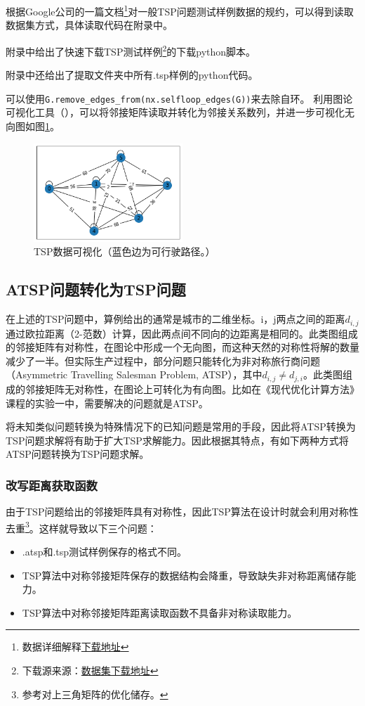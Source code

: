 \documentclass[lang=cn,11pt]{elegantpaper}
\begin{document}
根据Google公司的一篇文档\footnote{数据详细解释\href{https://docs.google.com/file/d/0B4zUGKjaO9uERU1RZDNuRkg3TW8/edit?resourcekey=0-MRgfJcUZrleab5nfdCOaoQ}{下载地址}}对一般TSP问题测试样例数据的规约，可以得到读取数据集方式，具体读取代码在附录中。

附录中给出了快速下载TSP测试样例\footnote{下载源来源：\href{http://elib.zib.de/pub/mp-testdata/tsp/tsplib/tsp/index.html}{数据集下载地址}}的下载python脚本。

附录中还给出了提取文件夹中所有.tsp样例的python代码。

可以使用\lstinline{G.remove_edges_from(nx.selfloop_edges(G))}来去除自环。
利用图论可视化工具（\cite{NetworkXweb}），可以将邻接矩阵读取并转化为邻接关系数列，并进一步可视化无向图如图\ref{img:TSP数据可视化}。
\begin{figure}[h]
  \centering
  \includegraphics[width=0.5\textwidth]{figure/TSP数据可视化.png} %
  \caption{TSP数据可视化（蓝色边为可行驶路径。）} %
  \label{img:TSP数据可视化} %
\end{figure}


\subsection{ATSP问题转化为TSP问题}

在上述的TSP问题中，算例给出的通常是城市的二维坐标。i，j两点之间的距离$d_{i,j}$通过欧拉距离（2-范数）计算，因此两点间不同向的边距离是相同的。此类图组成的邻接矩阵有对称性，在图论中形成一个无向图，而这种天然的对称性将解的数量减少了一半。但实际生产过程中，部分问题只能转化为非对称旅行商问题（Asymmetric Travelling Salesman Problem, ATSP），其中$d_{i,j}\neq d_{j,i}$。此类图组成的邻接矩阵无对称性，在图论上可转化为有向图。比如在《现代优化计算方法》课程的实验一中，需要解决的问题就是ATSP。

将未知类似问题转换为特殊情况下的已知问题是常用的手段，因此将ATSP转换为TSP问题求解将有助于扩大TSP求解能力。因此根据其特点，有如下两种方式将ATSP问题转换为TSP问题求解。
\subsubsection{改写距离获取函数}
由于TSP问题给出的邻接矩阵具有对称性，因此TSP算法在设计时就会利用对称性去重\footnote{参考对上三角矩阵的优化储存。}。这样就导致以下三个问题：
\begin{itemize}
    \item .atsp和.tsp测试样例保存的格式不同。
    \item TSP算法中对称邻接矩阵保存的数据结构会降重，导致缺失非对称距离储存能力。
    \item TSP算法中对称邻接矩阵距离读取函数不具备非对称读取能力。
\end{itemize}  
\end{document}
